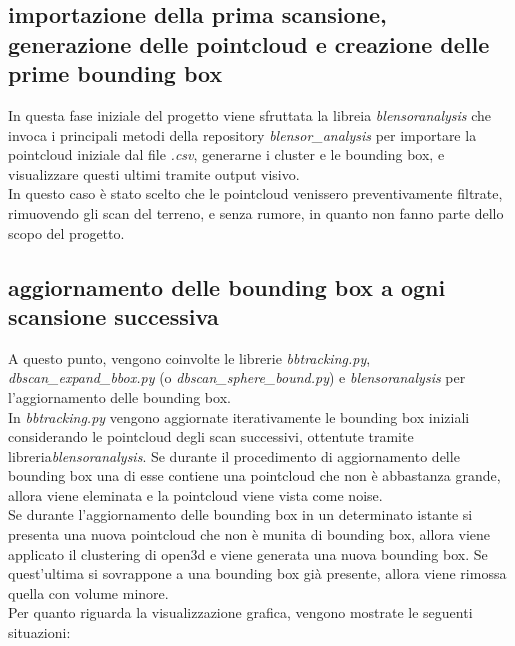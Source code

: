 \documentclass[italian]{article}
\begin{document}
\subsection{importazione della prima scansione, generazione delle pointcloud e creazione delle prime bounding box}
In questa fase iniziale del progetto viene sfruttata la libreia \textit{blensoranalysis} che invoca i principali metodi della repository \textit{blensor\_analysis} per importare la pointcloud iniziale dal file \textit{.csv}, generarne i cluster e le bounding box, e visualizzare questi ultimi tramite output visivo.\\
In questo caso è stato scelto che le pointcloud venissero preventivamente filtrate, rimuovendo gli scan del terreno, e senza rumore, in quanto non fanno parte dello scopo del progetto.\\
\subsection{aggiornamento delle bounding box a ogni scansione successiva}
A questo punto, vengono coinvolte le librerie \textit{bbtracking.py}, \textit{dbscan\_expand\_bbox.py} (o \textit{dbscan\_sphere\_bound.py}) e \textit{blensoranalysis} per l'aggiornamento delle bounding box.\\
In \textit{bbtracking.py} vengono aggiornate iterativamente le bounding box iniziali considerando le pointcloud degli scan successivi, ottentute tramite libreria\textit{blensoranalysis}. Se durante il procedimento di aggiornamento delle bounding box una di esse contiene una pointcloud che non è abbastanza grande, allora viene eleminata e la pointcloud viene vista come noise.\\
Se durante l'aggiornamento delle bounding box in un determinato istante si presenta una nuova pointcloud che non è munita di bounding box, allora viene applicato il clustering di open3d e viene generata una nuova bounding box. Se quest'ultima si sovrappone a una bounding box già presente, allora viene rimossa quella con volume minore.\\
Per quanto riguarda la visualizzazione grafica, vengono mostrate le seguenti situazioni:
\end{document}

